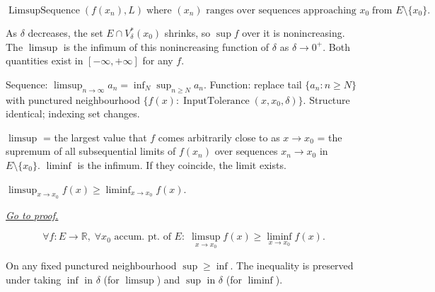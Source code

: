 \begin{remark*}
\[
  \operatorname{LimsupSequence}(f(x_n),L)
  \;\text{where }(x_n)\text{ ranges over sequences approaching }x_0
  \;\text{from }E\setminus\{x_0\}.
\]
\end{remark*}

\begin{remark*}
As $\delta$ decreases, the set $E\cap V_\delta^*(x_0)$ shrinks, so
$\sup f$ over it is nonincreasing. The $\limsup$ is the infimum of
this nonincreasing function of $\delta$ as $\delta\to 0^+$.
Both quantities exist in $[-\infty,+\infty]$ for any $f$.
\end{remark*}

\begin{remark*}
Sequence: $\limsup_{n\to\infty}a_n=\inf_N\sup_{n\geq N}a_n$.
Function: replace tail $\{a_n:n\geq N\}$ with punctured neighbourhood
$\{f(x):\operatorname{InputTolerance}(x,x_0,\delta)\}$.
Structure identical; indexing set changes.
\end{remark*}

\begin{remark*}[Interpretation]
$\limsup$ = the largest value that $f$ comes arbitrarily close to
as $x\to x_0$ = the supremum of all subsequential limits of $f(x_n)$
over sequences $x_n\to x_0$ in $E\setminus\{x_0\}$. $\liminf$ is
the infimum. If they coincide, the limit exists.
\end{remark*}


\begin{proposition}[$\limsup\geq\liminf$]
\label{prop:limsup-geq-liminf-function}
$\limsup_{x\to x_0}f(x)\geq\liminf_{x\to x_0}f(x)$.

\smallskip\noindent
\hyperref[prf:limsup-geq-liminf-function]{\textit{Go to proof.}}
\end{proposition}

\begin{remark*}
\[
  \forall f:E\to\mathbb{R},\;\forall x_0\text{ accum. pt. of }E:\;
  \limsup_{x\to x_0}f(x)\geq\liminf_{x\to x_0}f(x).
\]
\end{remark*}

\begin{remark*}[Interpretation]
On any fixed punctured neighbourhood $\sup\geq\inf$. The inequality
is preserved under taking $\inf$ in $\delta$ (for $\limsup$) and
$\sup$ in $\delta$ (for $\liminf$).
\end{remark*}

